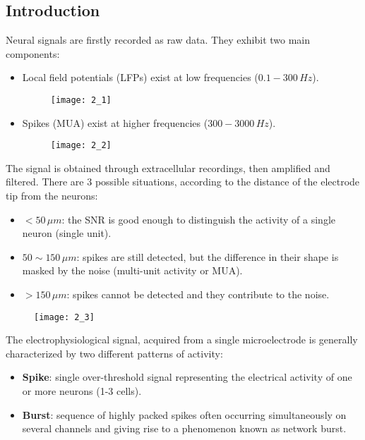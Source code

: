 \subsection{Introduction}
Neural signals are firstly recorded as raw data. They exhibit two main components:
\begin{itemize}
    \item Local field potentials (LFPs) exist at low frequencies (\(0.1-300\,Hz\)).
          \begin{figure}[H]
              \texttt{[image: 2\_1]}
              \centering
          \end{figure}
    \item Spikes (MUA) exist at higher frequencies (\(300-3000\,Hz\)).
          \begin{figure}[H]
              \texttt{[image: 2\_2]}
              \centering
          \end{figure}
\end{itemize}
The signal is obtained through extracellular recordings, then amplified and filtered. There are 3 possible
situations, according to the distance of the electrode tip from the neurons:
\begin{itemize}
    \item \(<50\,\mu{m}\): the SNR is good enough to distinguish the activity of a
          single neuron (single unit).
    \item \(50\sim150\,\mu{m}\): spikes are still detected, but the difference in their
          shape is masked by the noise (multi-unit activity or MUA).
    \item \(>150\,\mu{m}\): spikes cannot be detected and they contribute to the noise.
\end{itemize}
\begin{figure}[H]
    \texttt{[image: 2\_3]}
    \centering
\end{figure}
The electrophysiological signal, acquired from a single microelectrode is generally
characterized by two different patterns of activity:
\begin{itemize}
    \item \textbf{Spike}: single over-threshold signal representing the
          electrical activity of one or more neurons (1-3 cells).
    \item \textbf{Burst}: sequence of highly packed spikes often occurring simultaneously
          on several channels and giving rise to a phenomenon known as network burst.
\end{itemize}
